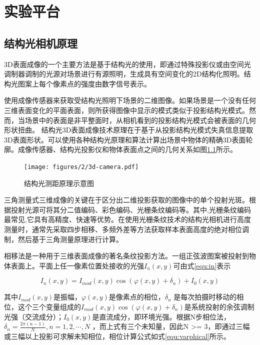 \chapter{实验平台}
\section{结构光相机原理}
3D表面成像的一个主要方法是基于结构光的使用，即通过特殊投影仪或由空间光调制器调制的光源对场景进行有源照明，生成具有空间变化的2D结构化照明。结构光图案上每个像素点的强度由数字信号表示。

使用成像传感器来获取受结构光照明下场景的二维图像。如果场景是一个没有任何三维表面变化的平面表面，则所获得图像中显示的模式类似于投影结构光模式。然而，当场景中的表面是非平整面时，从相机看到的投影结构光模式会被表面的几何形状扭曲。 结构光3D表面成像技术原理在于基于从投影结构光模式失真信息提取3D表面形状。可以使用各种结构光原理和算法计算出场景中物体的精确3D表面轮廓。成像传感器、结构光投影仪和物体表面点之间的几何关系如图\ref{fig:3d-camera}所示。\cite{gengStructuredlight3DSurface2011,salviStateArtStructured2010}




\begin{figure}[htbp]
  \centering
  \texttt{[image: figures/2/3d-camera.pdf]}
  \caption{结构光测距原理示意图}\label{fig:3d-camera}
\end{figure}

三角测量式三维成像的关键在于区分出二维投影获取的图像中的单个投射光斑。根据投射光源可将其分二值编码、彩色编码、光栅条纹编码等。其中,光栅条纹编码最常见,它具有高精度、快速等优势。\cite{vanderjeughtRealtimeStructuredLight2016}在使用光栅条纹技术的结构光相机进行高度测量时，通常先采取四步相移、多频外差等方法获取样本表面高度的绝对相位调制，然后基于三角测量原理进行计算。\cite{wangGuangzhajiegouguangxitongceliangwuchayunihejingduyanjiu2020}

相移法是一种用于三维表面成像的著名条纹投影方法。一组正弦波图案被投射到物体表面上。平面上任一像素位置处接收的光强$I_{n}(x, y)$可由式\ref{equ:in}表示

\begin{equation}\label{equ:in}
  I_{n}(x, y)=I_{mod}(x,y) \cos \left(\varphi(x, y)+\delta_{n}\right)+I_{0}(x,y)
\end{equation}


其中$I_{mod}(x,y)$是振幅，$\varphi(x, y)$是像素点的相位，$\delta_{n}$ 是每次拍摄时移动的相位，这个三个变量组成的$I_{mod}(x,y) \cos \left(\varphi(x, y)+\delta_{n}\right)$是系统投射的余弦调制光强（交流成分）；$I_{0}(x,y)$是直流成分，即环境光强。根据N步相位法，$\delta_{n}=\frac{2 \pi(n-1)}{N}, n=1,2, \cdots, N$ ，而上式有三个未知量，因此N >= 3，即通过三幅或三幅以上投影可求解未知相位，相位计算公式如式\ref{equ:varphical}所示。

